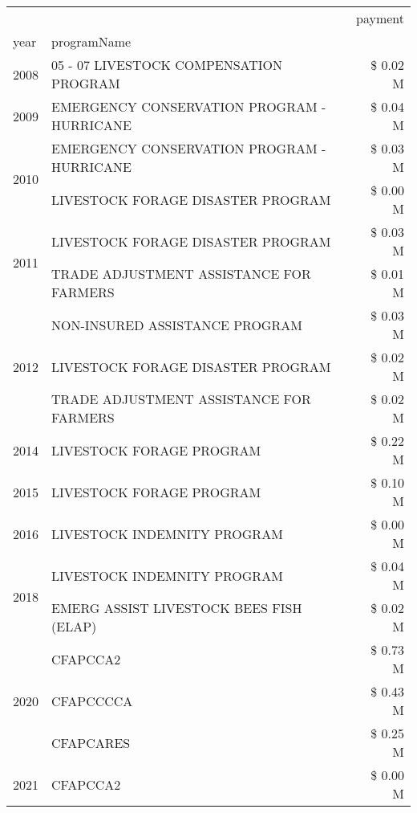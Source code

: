 \begin{tabular}{llr}
\toprule
 &  & payment \\
year & programName &  \\
\midrule
2008 & 05 - 07 LIVESTOCK COMPENSATION PROGRAM & \$ 0.02 M \\
\cline{1-3}
2009 & EMERGENCY CONSERVATION PROGRAM - HURRICANE & \$ 0.04 M \\
\cline{1-3}
\multirow[t]{2}{*}{2010} & EMERGENCY CONSERVATION PROGRAM - HURRICANE & \$ 0.03 M \\
 & LIVESTOCK FORAGE DISASTER  PROGRAM & \$ 0.00 M \\
\cline{1-3}
\multirow[t]{2}{*}{2011} & LIVESTOCK FORAGE DISASTER PROGRAM & \$ 0.03 M \\
 & TRADE ADJUSTMENT ASSISTANCE FOR FARMERS & \$ 0.01 M \\
\cline{1-3}
\multirow[t]{3}{*}{2012} & NON-INSURED ASSISTANCE PROGRAM & \$ 0.03 M \\
 & LIVESTOCK FORAGE DISASTER PROGRAM & \$ 0.02 M \\
 & TRADE ADJUSTMENT ASSISTANCE FOR FARMERS & \$ 0.02 M \\
\cline{1-3}
2014 & LIVESTOCK FORAGE PROGRAM & \$ 0.22 M \\
\cline{1-3}
2015 & LIVESTOCK FORAGE PROGRAM & \$ 0.10 M \\
\cline{1-3}
2016 & LIVESTOCK INDEMNITY PROGRAM & \$ 0.00 M \\
\cline{1-3}
\multirow[t]{2}{*}{2018} & LIVESTOCK INDEMNITY PROGRAM & \$ 0.04 M \\
 & EMERG ASSIST LIVESTOCK BEES FISH (ELAP) & \$ 0.02 M \\
\cline{1-3}
\multirow[t]{3}{*}{2020} & CFAPCCA2 & \$ 0.73 M \\
 & CFAPCCCCA & \$ 0.43 M \\
 & CFAPCARES & \$ 0.25 M \\
\cline{1-3}
2021 & CFAPCCA2 & \$ 0.00 M \\
\cline{1-3}
\bottomrule
\end{tabular}
